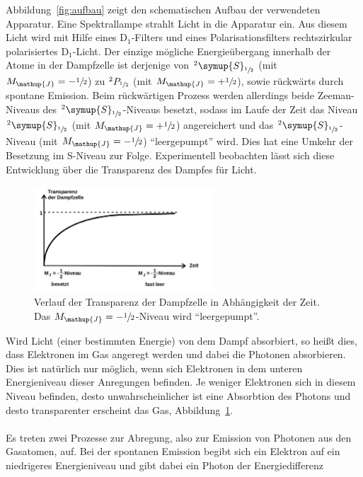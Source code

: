 \documentclass[
  bibliography=totoc,     %
  captions=tableheading,  %
  titlepage=firstiscover, %
]{scrartcl}
\begin{document}
\noindent
Abbildung~\ref{fig:aufbau} zeigt den schematischen Aufbau der verwendeten
Apparatur. Eine Spektrallampe strahlt Licht in die Apparatur ein. Aus diesem
Licht wird mit Hilfe eines $\text{D}_1$-Filters und eines Polarisationsfilters
rechtszirkular polarisiertes $\text{D}_1$-Licht. Der einzige mögliche
Energieübergang innerhalb der Atome in der Dampfzelle ist derjenige von
$^2\symup{S}_{\sfrac{1}{2}}$ (mit $M_\mathup{J}=-\sfrac{1}{2}$) zu
$^2P_{\sfrac{1}{2}}$ (mit $M_\mathup{J}=+\sfrac{1}{2}$), sowie rückwärts durch
spontane Emission. Beim rückwärtigen Prozess werden allerdings beide
Zeeman-Niveaus des $^2\symup{S}_{\sfrac{1}{2}}$-Niveaus besetzt, sodass im
Laufe der Zeit das Niveau $^2\symup{S}_{\sfrac{1}{2}}$ (mit
$M_\mathup{J}=+\sfrac{1}{2}$) angereichert und das
$^2\symup{S}_{\sfrac{1}{2}}$-Niveau (mit $M_\mathup{J}=-\sfrac{1}{2}$)
\enquote{leergepumpt} wird. Dies hat eine Umkehr der Besetzung im S-Niveau zur
Folge. Experimentell beobachten lässt sich diese Entwicklung über die
Transparenz des Dampfes für Licht.
%
\begin{figure}[htb]
  \centering
  \includegraphics[width=0.6\textwidth]{transparenz.pdf}
  \caption{Verlauf der Transparenz der Dampfzelle in Abhängigkeit der Zeit. Das $M_\mathup{J}=-\sfrac{1}{2}$-Niveau wird \enquote{leergepumpt}\cite{anleitung}.}
  \label{fig:transparenz}
\end{figure}
\noindent
Wird Licht (einer bestimmten Energie) von dem Dampf absorbiert, so heißt dies,
dass Elektronen im Gas angeregt werden und dabei die Photonen absorbieren. Dies
ist natürlich nur möglich, wenn sich Elektronen in dem unteren Energieniveau
dieser Anregungen befinden. Je weniger Elektronen sich in diesem Niveau
befinden, desto unwahrscheinlicher ist eine Absorbtion des Photons und desto
transparenter erscheint das Gas, Abbildung~\ref{fig:transparenz}. \\
\\
Es treten zwei Prozesse zur Abregung, also zur Emission von Photonen aus den
Gasatomen, auf. Bei der spontanen Emission begibt sich ein Elektron auf
ein niedrigeres Energieniveau und gibt dabei ein Photon der Energiedifferenz
\end{document}
